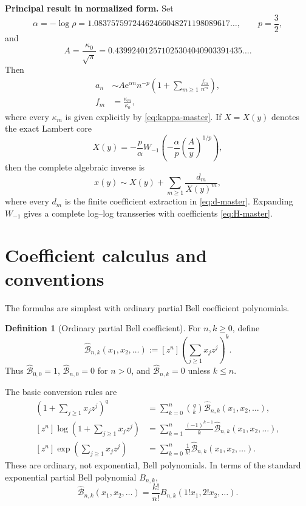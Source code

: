 \documentclass[11pt]{article}
\theoremstyle{definition}
\newtheorem{definition}[theorem]{Definition}
\theoremstyle{remark}
\newcommand{\Bell}{\widehat{\mathcal B}}
\newcommand{\e}{\mathrm e}
\newcommand{\defeq}{\mathrel{:=}}
\begin{document}
\begin{resultbox}
\textbf{Principal result in normalized form.}
Set
\[
 \alpha=-\log\rho=1.08375759724462466048271198089617\ldots,
 \qquad p=\frac32,
\]
and
\[
 A=\frac{\kappa_0}{\sqrt\pi}
 =0.439924012571025304040903391435\ldots.
\]
Then
\begin{align*}
 a_n
 &\sim A\e^{\alpha n}n^{-p}
       \left(1+\sum_{m\geq1}\frac{f_m}{n^m}\right),\\
 f_m&=\frac{\kappa_m}{\kappa_0},
\end{align*}
where every $\kappa_m$ is given explicitly by \cref{eq:kappa-master}.
If $X=X(y)$ denotes the exact Lambert core
\[
 X(y)=-\frac{p}{\alpha}
 W_{-1}\!\left(-\frac{\alpha}{p}
                 \left(\frac{A}{y}\right)^{1/p}\right),
\]
then the complete algebraic inverse is
\[
 x(y)\sim X(y)+\sum_{m\geq1}\frac{d_m}{X(y)^m},
\]
where every $d_m$ is the finite coefficient extraction in
\cref{eq:d-master}.  Expanding $W_{-1}$ gives a complete log--log transseries
with coefficients \cref{eq:H-master}.
\end{resultbox}

\section{Coefficient calculus and conventions}
\label{sec:calculus}

The formulas are simplest with ordinary partial Bell coefficient
polynomials.

\begin{definition}[Ordinary partial Bell coefficient]
For $n,k\geq0$, define
\begin{equation}
 \Bell_{n,k}(x_1,x_2,\ldots)
 \defeq [z^n]\left(\sum_{j\geq1}x_jz^j\right)^k.
 \label{eq:ordinary-bell}
\end{equation}
Thus $\Bell_{0,0}=1$, $\Bell_{n,0}=0$ for $n>0$, and
$\Bell_{n,k}=0$ unless $k\leq n$.
\end{definition}

The basic conversion rules are
\begin{align}
 [z^n]\left(1+\sum_{j\geq1}x_jz^j\right)^q
 &=\sum_{k=0}^n\binom qk\Bell_{n,k}(x_1,x_2,\ldots),
 \label{eq:bell-power}\\
 [z^n]\log\left(1+\sum_{j\geq1}x_jz^j\right)
 &=\sum_{k=1}^n\frac{(-1)^{k-1}}{k}\Bell_{n,k}(x_1,x_2,\ldots),
 \label{eq:bell-log}\\
 [z^n]\exp\left(\sum_{j\geq1}x_jz^j\right)
 &=\sum_{k=0}^n\frac1{k!}\Bell_{n,k}(x_1,x_2,\ldots).
 \label{eq:bell-exp}
\end{align}
These are ordinary, not exponential, Bell polynomials.  In terms of the
standard exponential partial Bell polynomial $B_{n,k}$,
\[
 \Bell_{n,k}(x_1,x_2,\ldots)
 =\frac{k!}{n!}
 B_{n,k}(1!x_1,2!x_2,\ldots).
\]
\end{document}
